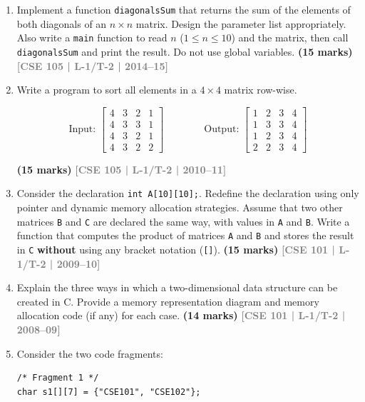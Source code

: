 \documentclass[12pt,a3paper]{article}
\newcommand{\yr}[1]{\hfill\textcolor{gray}{\small\textbf{[#1]}}}
\newcommand{\mk}[1]{\textcolor{orange!70!black}{\small\textbf{(#1 marks)}}}
\begin{document}
\begin{enumerate}
\item Implement a function \texttt{diagonalsSum} that returns the sum of the elements of both diagonals of an $n \times n$ matrix. Design the parameter list appropriately. Also write a \texttt{main} function to read $n$ ($1 \le n \le 10$) and the matrix, then call \texttt{diagonalsSum} and print the result. Do not use global variables.
\mk{15} \yr{CSE 105 | L-1/T-2 | 2014--15}

\item Write a program to sort all elements in a $4 \times 4$ matrix row-wise.
\begin{center}
  \begin{equation*}
\text{Input: } 
\begin{bmatrix}
4 & 3 & 2 & 1 \\
4 & 3 & 3 & 1 \\
4 & 3 & 2 & 1 \\
4 & 3 & 2 & 2
\end{bmatrix}
\qquad\qquad \text{Output: }
\begin{bmatrix}
1 & 2 & 3 & 4 \\
1 & 3 & 3 & 4 \\
1 & 2 & 3 & 4 \\
2 & 2 & 3 & 4
\end{bmatrix}
\end{equation*}
\end{center}
\mk{15} \yr{CSE 105 | L-1/T-2 | 2010--11}

\item Consider the declaration \texttt{int A[10][10];}. Redefine the declaration using only pointer and dynamic memory allocation strategies. Assume that two other matrices \texttt{B} and \texttt{C} are declared the same way, with values in \texttt{A} and \texttt{B}. Write a function that computes the product of matrices \texttt{A} and \texttt{B} and stores the result in \texttt{C} \textbf{without} using any bracket notation (\texttt{[]}).
\mk{15} \yr{CSE 101 | L-1/T-2 | 2009--10}

\item Explain the three ways in which a two-dimensional data structure can be created in C. Provide a memory representation diagram and memory allocation code (if any) for each case.
\mk{14} \yr{CSE 101 | L-1/T-2 | 2008--09}

\item Consider the two code fragments:
\begin{lstlisting}
/* Fragment 1 */
char s1[][7] = {"CSE101", "CSE102"};


\end{lstlisting}
\end{enumerate}
\end{document}
